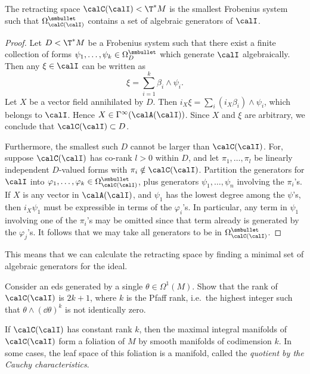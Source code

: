\begin{prop}
    The retracting space $\calC(\calI)<\T^\ast M$ is the smallest Frobenius system such that $\Omega^{\smbullet}_{\calC(\calI)}$ contains a set of algebraic generators of $\calI$.
\end{prop}
\begin{proof}
    Let $D<\T^\ast M$ be a Frobenius system such that there exist a finite collection of forms $\psi_1,\ldots,\psi_k\in \Omega^{\smbullet}_D$ which generate $\calI$ algebraically. Then any $\xi\in \calI$ can be written as
    \[\xi=\sum_{i=1}^k \beta_i\wedge \psi_i.\]
    Let $X$ be a vector field annihilated by $D$. Then $i_X \xi=\sum_i (i_X \beta_i)\wedge\psi_i$, which belongs to $\calI$. Hence $X\in\Gamma^\infty(\calA(\calI))$. Since $X$ and $\xi$ are arbitrary, we conclude that $\calC(\calI)\subset D$.

    Furthermore, the smallest such $D$ cannot be larger than $\calC(\calI)$. For, suppose $\calC(\calI)$ has co-rank $l>0$ within $D$, and let $\pi_1,\ldots,\pi_l$ be linearly independent $D$-valued forms with $\pi_i\notin \calC(\calI)$. Partition the generators for $\calI$ into $\varphi_1,\ldots,\varphi_k\in \Omega^{\smbullet}_{\calC(\calI)}$, plus generators $\psi_1,\ldots,\psi_n$ involving the $\pi_i$'s. If $X$ is any vector in $\calA(\calI)$, and $\psi_1$ has the lowest degree among the $\psi$'s, then $i_X\psi_1$ must be expressible in terms of the $\varphi_i$'s. In particular, any term in $\psi_1$ involving one of the $\pi_i$'s may be omitted since that term already is generated by the $\varphi_j$'s. It follows that we may take all generators to be in $\Omega^{\smbullet}_{\calC(\calI)}$.
\end{proof}

This means that we can calculate the retracting space by finding a minimal set of algebraic generators for the ideal.

\begin{xca}
    Consider an \gls{eds} generated by a single $\theta\in\Omega^1(M)$. Show that the rank of $\calC(\calI)$ is $2k+1$, where $k$ is the Pfaff rank, i.e.\ the highest integer such that $\theta\wedge (\dd\theta)^k$ is not identically zero.
\end{xca}

If $\calC(\calI)$ has constant rank $k$,  then the maximal integral manifolds of $\calC(\calI)$ form a foliation of $M$ by smooth manifolds of codimension $k$. In some cases, the leaf space of this foliation is a manifold, called the \emph{quotient by the Cauchy characteristics}.


